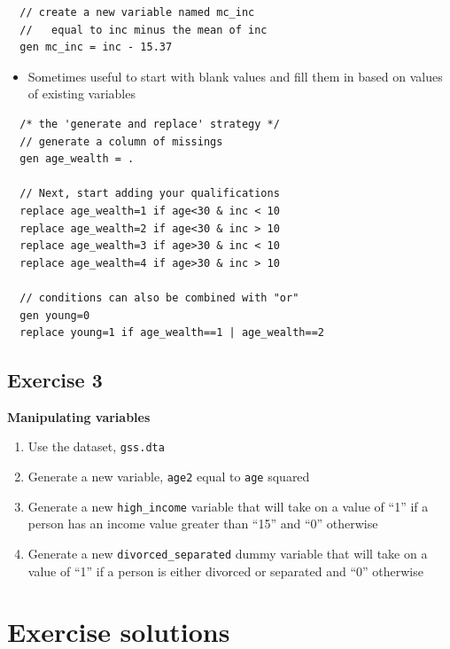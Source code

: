 \documentclass[]{book}
\providecommand{\tightlist}{%
  \setlength{\itemsep}{0pt}\setlength{\parskip}{0pt}}
\begin{document}
\begin{verbatim}
  // create a new variable named mc_inc
  //   equal to inc minus the mean of inc
  gen mc_inc = inc - 15.37  
\end{verbatim}

\begin{itemize}
\tightlist
\item
  Sometimes useful to start with blank values and fill them in based on
  values of existing variables
\end{itemize}

\begin{verbatim}
  /* the 'generate and replace' strategy */ 
  // generate a column of missings
  gen age_wealth = .

  // Next, start adding your qualifications
  replace age_wealth=1 if age<30 & inc < 10
  replace age_wealth=2 if age<30 & inc > 10
  replace age_wealth=3 if age>30 & inc < 10
  replace age_wealth=4 if age>30 & inc > 10

  // conditions can also be combined with "or"
  gen young=0
  replace young=1 if age_wealth==1 | age_wealth==2
\end{verbatim}

\subsection{Exercise 3}\label{exercise-3-4}

\textbf{Manipulating variables}

\begin{enumerate}
\def\labelenumi{\arabic{enumi}.}
\tightlist
\item
  Use the dataset, \texttt{gss.dta}
\item
  Generate a new variable, \texttt{age2} equal to \texttt{age} squared
\item
  Generate a new \texttt{high\_income} variable that will take on a
  value of ``1'' if a person has an income value greater than ``15'' and
  ``0'' otherwise
\item
  Generate a new \texttt{divorced\_separated} dummy variable that will
  take on a value of ``1'' if a person is either divorced or separated
  and ``0'' otherwise
\end{enumerate}

\section{Exercise solutions}\label{exercise-solutions-6}
\end{document}
